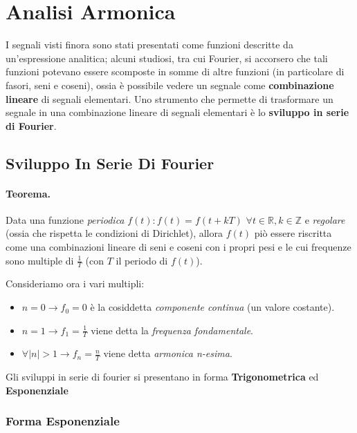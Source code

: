 \AtUpperLeft{\raisebox{-1cm}{\textsf{\small \today}}}

\section{Analisi Armonica}
I segnali visti finora sono stati presentati come funzioni descritte da un'espressione analitica; alcuni studiosi, tra cui Fourier,
si accorsero che tali funzioni potevano essere scomposte in somme di altre funzioni (in particolare di fasori, seni e coseni), ossia
è possibile vedere un segnale come \textbf{combinazione lineare} di segnali elementari. Uno strumento che permette di trasformare
un segnale in una combinazione lineare di segnali elementari è lo \textbf{sviluppo in serie di Fourier}.

\subsection{Sviluppo In Serie Di Fourier}
\begin{highlightedeq}
    \paragraph{Teorema.}Data una funzione \textit{periodica} $f(t) : f(t) = f(t + kT)$  $\forall t \in \mathbb{R}, k \in \mathbb{Z}$ e \textit{regolare}
    (ossia che rispetta le condizioni di Dirichlet), allora $f(t)$ piò essere riscritta come una combinazioni lineare di seni e 
    coseni con i propri pesi e le cui frequenze sono multiple di $\frac{1}{T}$ (con $T$ il periodo di $f(t)$).
\end{highlightedeq}

Consideriamo ora i vari multipli:
\begin{itemize}
    \item $n = 0 \longrightarrow f_0 = 0$ è la cosiddetta \textit{componente continua} (un valore costante).
    \item $n = 1 \longrightarrow f_1 = \frac{1}{T}$ viene detta la \textit{frequenza fondamentale}.
    \item $\forall |n| > 1 \longrightarrow f_n = \frac{n}{T}$ viene detta \textit{armonica n-esima}.
\end{itemize}

Gli sviluppi in serie di fourier si presentano in forma \textbf{Trigonometrica} ed \textbf{Esponenziale}

\subsubsection{Forma Esponenziale}
